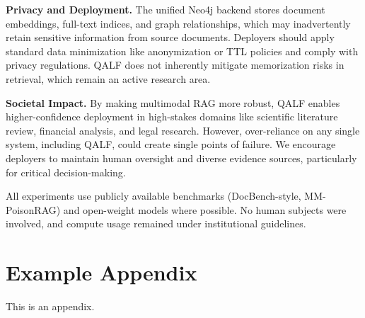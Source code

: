 \documentclass[11pt]{article}
\begin{document}
\textbf{Privacy and Deployment.} The unified Neo4j backend stores document embeddings, full-text indices, and graph relationships, which may inadvertently retain sensitive information from source documents. Deployers should apply standard data minimization like anonymization or TTL policies and comply with privacy regulations. QALF does not inherently mitigate memorization risks in retrieval, which remain an active research area.

\textbf{Societal Impact.} By making multimodal RAG more robust, QALF enables higher-confidence deployment in high-stakes domains like scientific literature review, financial analysis, and legal research. However, over-reliance on any single system, including QALF, could create single points of failure. We encourage deployers to maintain human oversight and diverse evidence sources, particularly for critical decision-making.

All experiments use publicly available benchmarks (DocBench-style, MM-PoisonRAG) and open-weight models where possible. No human subjects were involved, and compute usage remained under institutional guidelines.

%


\appendix

\section{Example Appendix}
\label{sec:appendix}

This is an appendix.
\end{document}

